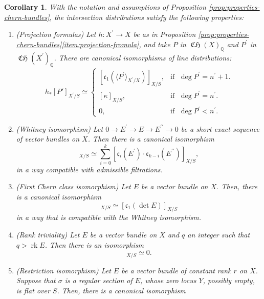 \documentclass[JEP,XML,SOM,Unicode,published]{cedram}
\theoremstyle{plain}
\newtheorem{corollary}[theorem]{Corollary}
\theoremstyle{definition}
\newcommand{\QBbb}{\mathbb Q}
\newcommand{\cfrak}{\mathfrak c}
\newcommand{\bis}{\prime\prime}
\DeclareMathOperator{\CHfrak}{\mathfrak{CH}}
\DeclareMathOperator{\rk}{rk}
\begin{document}
\begin{corollary}\label{cor:properties-intersection-distribution}
With the notation and assumptions of Proposition \ref{prop:properties-chern-bundles}, the intersection distributions satisfy the following properties:
\begin{enumerate}
\item (Projection formulas) Let $h\colon X^{\prime}\to X$ be as in Proposition \ref{prop:properties-chern-bundles}\eqref{item:projection-fromula}, and take $P$ in $\CHfrak(X)_{\QBbb}$ and $P^{\prime}$ in $\CHfrak(X^{\prime})_{\QBbb}$. There are canonical isomorphisms of line distributions:
\begin{displaymath}
h_\ast [P']_{X^{\prime}/S} \simeq
\begin{cases}
\left[ \cfrak_1 (\langle P^{\prime} \rangle_{X^{\prime}/X})\right]_{X/S}, & \text{if }\; \deg P^{\prime}=n^{\prime}+1.\\
[ \kappa ]_{X/S}, & \text{if }\; \deg P^{\prime} = n^{\prime}. \\
0, & \text{if }\; \deg P^{\prime} < n^{\prime}.
\end{cases}
\end{displaymath}
\item\label{item:prop-int-dist-whitney} (Whitney isomorphism) Let $0 \to E^{\prime}\to E \to E^{\bis} \to 0$ be a short exact sequence of vector bundles on $X$. Then there is a canonical isomorphism
\begin{displaymath}
[\cfrak_{k}(E)]_{X/S}\simeq \sum_{i=0}^{k} [\cfrak_{i}(E^{\prime})\cdot\cfrak_{k-i}(E^{\bis})]_{X/S},
\end{displaymath}
in a way compatible with admissible filtrations.
\item\label{item:prop-int-dist-c1-det} (First Chern class isomorphism) Let $E$ be a vector bundle on $X$. Then, there is a canonical isomorphism
\begin{displaymath}
[\cfrak_1(E)]_{X/S} \simeq [\cfrak_1(\det E)]_{X/S}
\end{displaymath}
in a way that is compatible with the Whitney isomorphism.
\item\label{item:prop-int-dist-rank} (Rank triviality) Let $E$ be a vector bundle on $X$ and $q$ an integer such that $q > \rk E$. Then there is an isomorphism
\begin{displaymath}
[ \cfrak_q(E)]_{X/S} \simeq 0.
\end{displaymath}
\item\label{item:prop-int-dist-restriction} (Restriction isomorphism) Let $E$ be a vector bundle of constant rank $r$ on $X$. Suppose that $\sigma$ is a regular section of $E$, whose zero locus $Y$, possibly empty, is flat over $S$. Then, there is a canonical isomorphism

\end{enumerate}
\end{corollary}
\end{document}
